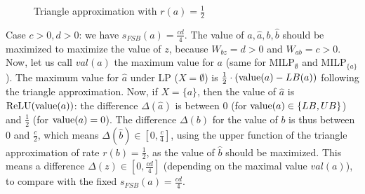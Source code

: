 {\begin{figure}[t!]
\begin{centering}
		\caption{Triangle approximation with $r(a)=\frac{1}{2}$
		\vspace{-0.3cm}}
	\label{triangle}
	\end{centering}
	\end{figure}
\fi




Case $c>0,d>0$: we have $s_{FSB}(a)=\frac{cd}{4}$.
The value of $a,\hat{a},b,\hat{b}$ should be maximized to maximize the value of $z$, because $W_{bz}=d>0$ and $W_{ab}=c>0$. 
Now, let us call $val(a)$ the maximum value for $a$ 
(same for MILP$_\emptyset$ and MILP$_{\{a\}}$).
The maximum value for $\hat{a}$ under LP ($X=\emptyset$) is 
$\frac{1}{2} \cdot ({\textrm{value}}(a)-LB(a))$ following the triangle approximation. 
Now, if $X=\{a\}$, then the value of $\hat{a}$ is $\mathrm{ReLU}({\textrm{value}}(a))$: the difference 
$\Delta(\hat{a})$ is between 0 (for ${\textrm{value}}(a)\in \{LB,UB\}$) and $\frac{1}{2}$ (for ${\textrm{value}}(a)=0$). The difference $\Delta(b)$ for the value of $b$ is thus between 0 and $\frac{c}{2}$, which means $\Delta(\hat{b}) \in [0, \frac{c}{4}]$, using the upper function of the triangle approximation of rate $r(b)=\frac{1}{2}$, as the value of $\hat{b}$ should be maximized.
This means a difference $\Delta(z) \in [0, \frac{cd}{4}]$ 
(depending on the maximal value $val(a)$), to compare with the fixed 
$s_{FSB}(a)=\frac{cd}{4}$.


\begin{figure}[t!]
	\centering
\end{figure}}
